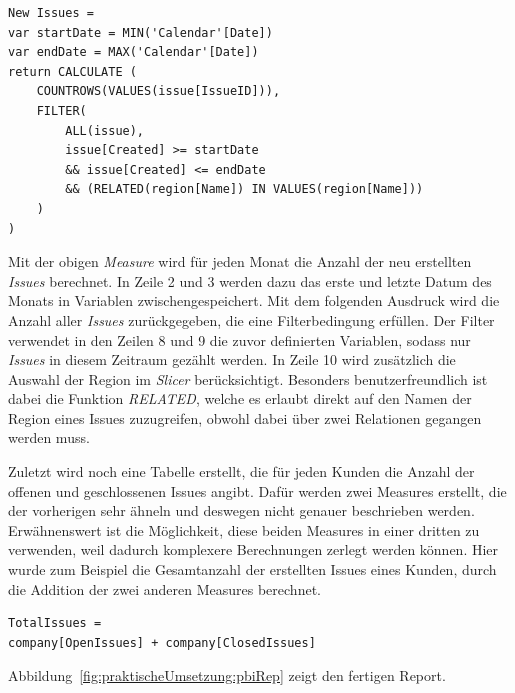 \begin{minipage}{\linewidth}
\begin{lstlisting}[caption=Measure: Anzahl neuer \textit{Issues} in einem Zeitabschnitt,captionpos=b]
New Issues = 
var startDate = MIN('Calendar'[Date])
var endDate = MAX('Calendar'[Date])
return CALCULATE (
    COUNTROWS(VALUES(issue[IssueID])), 
    FILTER(
        ALL(issue),
        issue[Created] >= startDate 
        && issue[Created] <= endDate 
        && (RELATED(region[Name]) IN VALUES(region[Name]))
    )
)
\end{lstlisting}
\end{minipage}

\noindent Mit der obigen \textit{Measure} wird für jeden Monat die Anzahl der neu erstellten \textit{Issues} berechnet. In Zeile 2 und 3 werden dazu das erste und letzte Datum des Monats in Variablen zwischengespeichert. Mit dem folgenden Ausdruck wird die Anzahl aller \textit{Issues} zurückgegeben, die eine Filterbedingung erfüllen. Der Filter verwendet in den Zeilen 8 und 9 die zuvor definierten Variablen, sodass nur \textit{Issues} in diesem Zeitraum gezählt werden. In Zeile 10 wird zusätzlich die Auswahl der Region im \textit{Slicer} berücksichtigt. Besonders benutzerfreundlich ist dabei die Funktion \textit{RELATED}, welche es erlaubt direkt auf den Namen der Region eines Issues zuzugreifen, obwohl dabei über zwei Relationen gegangen werden muss. 

Zuletzt wird noch eine Tabelle erstellt, die für jeden Kunden die Anzahl der offenen und geschlossenen Issues angibt. Dafür werden zwei Measures erstellt, die der vorherigen sehr ähneln und deswegen nicht genauer beschrieben werden. Erwähnenswert ist die Möglichkeit, diese beiden Measures in einer dritten zu verwenden, weil dadurch komplexere Berechnungen zerlegt werden können. Hier wurde zum Beispiel die Gesamtanzahl der erstellten Issues eines Kunden, durch die Addition der zwei anderen Measures berechnet.

\begin{minipage}{\linewidth}
\begin{lstlisting}[captionpos=b, caption={[Verwendung von Measures in Measure]Verwendung von Measures in Measure. Die Verwendung einer Measure unterscheidet sich nicht von einer normalen Spalte.}]
TotalIssues = 
company[OpenIssues] + company[ClosedIssues]
\end{lstlisting}
\end{minipage}

\noindent Abbildung~\ref{fig:praktischeUmsetzung:pbiRep} zeigt den fertigen Report.

